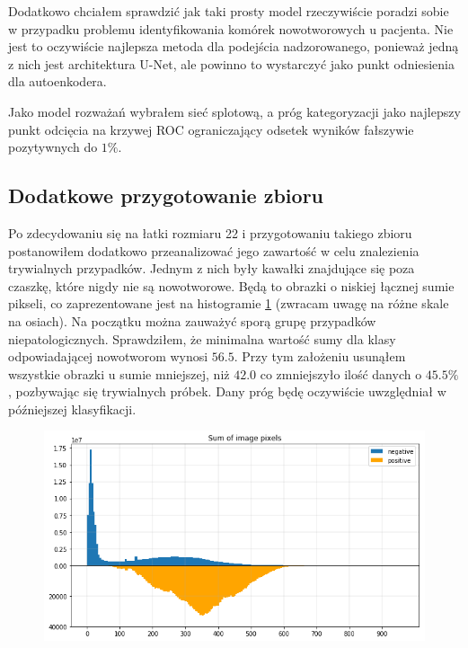 Dodatkowo chciałem sprawdzić jak taki prosty model rzeczywiście poradzi sobie w przypadku problemu identyfikowania komórek nowotworowych u pacjenta. Nie jest to oczywiście najlepsza metoda dla podejścia nadzorowanego, ponieważ jedną z nich jest architektura U-Net, ale powinno to wystarczyć jako punkt odniesienia dla autoenkodera.

Jako model rozważań wybrałem sieć splotową, a próg kategoryzacji jako najlepszy punkt odcięcia na krzywej ROC ograniczający odsetek wyników fałszywie pozytywnych do $1\%$.

\subsection{Dodatkowe przygotowanie zbioru}

Po zdecydowaniu się na łatki rozmiaru 22 i przygotowaniu takiego zbioru postanowiłem dodatkowo przeanalizować jego zawartość w celu znalezienia trywialnych przypadków. Jednym z nich były kawałki znajdujące się poza czaszkę, które nigdy nie są nowotworowe. Będą to obrazki o niskiej łącznej sumie pikseli, co zaprezentowane jest na histogramie \ref{fig:pixel_sums} (zwracam uwagę na różne skale na osiach). Na początku można zauważyć sporą grupę przypadków niepatologicznych. Sprawdziłem, że minimalna wartość sumy dla klasy odpowiadającej nowotworom wynosi $56.5$. Przy tym założeniu usunąłem wszystkie obrazki u sumie mniejszej, niż $42.0$ co zmniejszyło ilość danych o $45.5\%$, pozbywając się trywialnych próbek. Dany próg będę oczywiście uwzględniał w późniejszej klasyfikacji.

\begin{figure}[h!]
    \centering
    \includegraphics[width=1.0\textwidth]{images/pixel_sums}
    \caption{}
    \label{fig:pixel_sums}
\end{figure}
